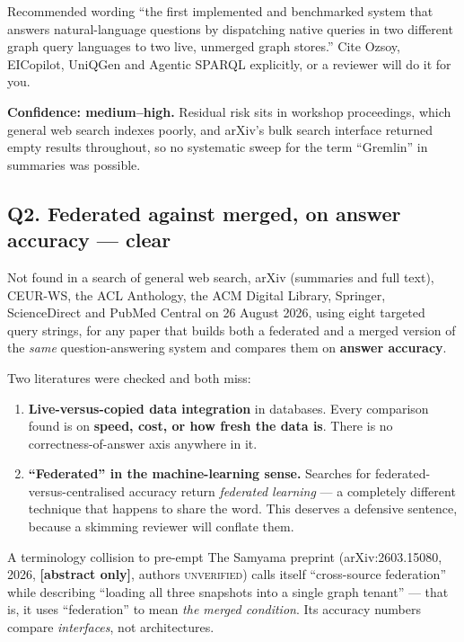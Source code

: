 \documentclass[11pt,a4paper]{article}
\newcommand{\vclear}{\textcolor{clear}{\textbf{clear}}}
\newcommand{\abstag}{\textcolor{partial}{\textbf{[abstract only]}}}
\newcommand{\unver}{\textcolor{killed}{\textsc{unverified}}}
\begin{document}
\begin{keybox}{Recommended wording}
``the first implemented and benchmarked system that answers natural-language
questions by dispatching native queries in two different graph query languages to
two live, unmerged graph stores.'' Cite Ozsoy, EICopilot, UniQGen and Agentic
SPARQL explicitly, or a reviewer will do it for you.
\end{keybox}

\textbf{Confidence: medium--high.} Residual risk sits in workshop proceedings,
which general web search indexes poorly, and arXiv's bulk search interface returned
empty results throughout, so no systematic sweep for the term ``Gremlin'' in
summaries was possible.

\subsection{Q2. Federated against merged, on answer accuracy --- \texorpdfstring{\vclear}{clear}}

Not found in a search of general web search, arXiv (summaries and full text),
CEUR-WS, the ACL Anthology, the ACM Digital Library, Springer, ScienceDirect and
PubMed Central on 26 August 2026, using eight targeted query strings, for any paper
that builds both a federated and a merged version of the \emph{same}
question-answering system and compares them on \textbf{answer accuracy}.

Two literatures were checked and both miss:

\begin{enumerate}
\item \textbf{Live-versus-copied data integration} in databases. Every comparison
      found is on \textbf{speed, cost, or how fresh the data is}. There is no
      correctness-of-answer axis anywhere in it.
\item \textbf{``Federated'' in the machine-learning sense.} Searches for
      federated-versus-centralised accuracy return \emph{federated learning} --- a
      completely different technique that happens to share the word. This deserves
      a defensive sentence, because a skimming reviewer will conflate them.
\end{enumerate}

\begin{keybox}{A terminology collision to pre-empt}
The Samyama preprint (arXiv:2603.15080, 2026, \abstag, authors \unver) calls itself
``cross-source federation'' while describing ``loading all three snapshots into a
single graph tenant'' --- that is, it uses ``federation'' to mean \emph{the merged
condition}. Its accuracy numbers compare \emph{interfaces}, not architectures.
\end{keybox}
\end{document}
